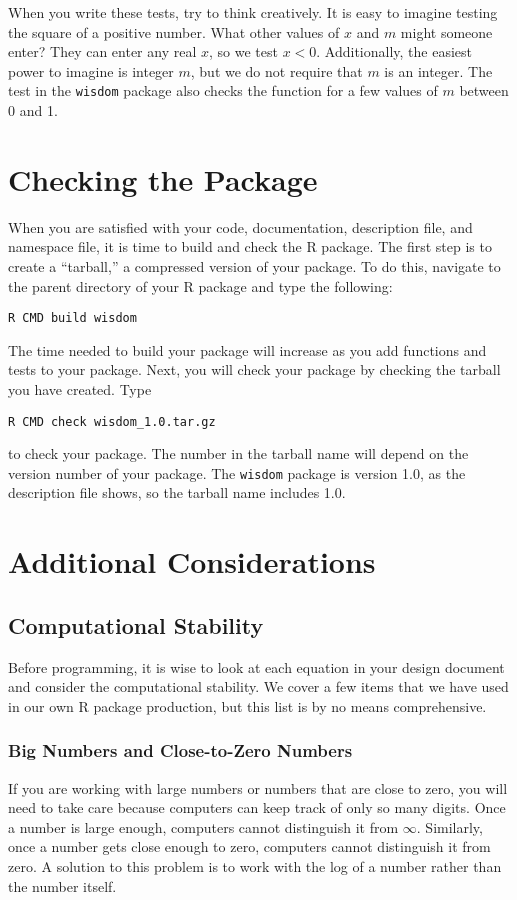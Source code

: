 \documentclass{article}
\begin{document}
 When you write these tests, try to think creatively. It is easy to imagine testing the square of a positive number. What other values of $x$ and $m$ might someone enter? They can enter any real $x$, so we test $x < 0$. Additionally, the easiest power to imagine is integer $m$, but we do not require that $m$ is an integer. The test in the \texttt{wisdom} package also checks  the function for a few values of $m$ between 0 and 1.



\section{Checking the Package}
When you are satisfied with your code, documentation, description file, and namespace file, it is time to build and check the R package. The first step is to create a ``tarball,'' a compressed version of your package. To do this, navigate to the parent directory of your R package and type the following:
\begin{verbatim}
R CMD build wisdom
\end{verbatim}
The time needed to build your package will increase as you add functions and tests to your package. Next, you will check your package by checking the tarball you have created. Type
\begin{verbatim}
R CMD check wisdom_1.0.tar.gz 
\end{verbatim} 
to check your package. The number in the tarball name will depend on the version number of your package. The \texttt{wisdom} package is version 1.0, as the description file shows, so the tarball name includes 1.0. 

\section{Additional Considerations}


\subsection{Computational Stability}
Before programming, it is wise to  look at each equation in your design document and consider the computational stability. We cover a few items that we have used in our own R package production, but this list is by no means comprehensive.

\subsubsection{Big Numbers and Close-to-Zero Numbers}
If you are working with large numbers or numbers that are close to zero, you will need to take care because computers can keep track of only so many digits. Once a number is large enough,  computers cannot distinguish it from $\infty$. Similarly, once a number gets close enough to zero, computers cannot distinguish it from zero. A solution to this problem is to work with the log of a  number rather  than the number itself. 
\end{document}
